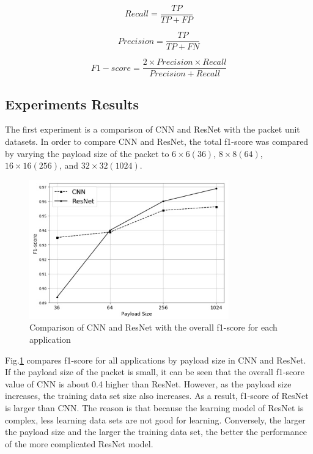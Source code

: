\begin{equation}
Recall =  \frac{TP}{TP + FP}
\end{equation}

\begin{equation}
Precision =  \frac{TP}{TP + FN}
\end{equation}

\begin{equation}
F1-score =  \frac{2 \times Precision \times Recall}{Precision + Recall}
\end{equation}

\subsection{Experiments Results}
The first experiment is a comparison of CNN and ResNet with the packet unit datasets.
In order to compare CNN and ResNet, the total f1-score was compared by varying the payload size of the packet to $6 \times 6 (36)$, $8 \times 8 (64)$, $16 \times 16 (256)$, and $32 \times 32 (1024)$.

\begin{figure}[t]
\centering
{
\includegraphics[width=3.4in]{fig7.jpg}
\caption{Comparison of CNN and ResNet with the overall f1-score for each application}
\label{fig7}
}
\end{figure}

Fig.\ref{fig7} compares f1-score for all applications by payload size in CNN and ResNet.
If the payload size of the packet is small, it can be seen that the overall f1-score value of CNN is about 0.4 higher than ResNet.
However, as the payload size increases, the training data set size also increases.
As a result, f1-score of ResNet is larger than CNN.
The reason is that because the learning model of ResNet is complex, less learning data sets are not good for learning.
Conversely, the larger the payload size and the larger the training data set, the better the performance of the more complicated ResNet model.

